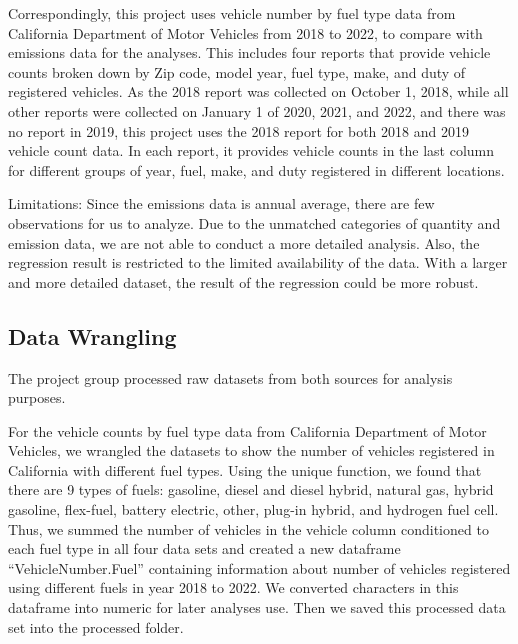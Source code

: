 \documentclass[
  12pt,
]{article}
\begin{document}
Correspondingly, this project uses vehicle number by fuel type data from
California Department of Motor Vehicles from 2018 to 2022, to compare
with emissions data for the analyses. This includes four reports that
provide vehicle counts broken down by Zip code, model year, fuel type,
make, and duty of registered vehicles. As the 2018 report was collected
on October 1, 2018, while all other reports were collected on January 1
of 2020, 2021, and 2022, and there was no report in 2019, this project
uses the 2018 report for both 2018 and 2019 vehicle count data. In each
report, it provides vehicle counts in the last column for different
groups of year, fuel, make, and duty registered in different locations.

Limitations: Since the emissions data is annual average, there are few
observations for us to analyze. Due to the unmatched categories of
quantity and emission data, we are not able to conduct a more detailed
analysis. Also, the regression result is restricted to the limited
availability of the data. With a larger and more detailed dataset, the
result of the regression could be more robust.

\hypertarget{data-wrangling}{%
\subsection{Data Wrangling}\label{data-wrangling}}

The project group processed raw datasets from both sources for analysis
purposes.

For the vehicle counts by fuel type data from California Department of
Motor Vehicles, we wrangled the datasets to show the number of vehicles
registered in California with different fuel types. Using the unique
function, we found that there are 9 types of fuels: gasoline, diesel and
diesel hybrid, natural gas, hybrid gasoline, flex-fuel, battery
electric, other, plug-in hybrid, and hydrogen fuel cell. Thus, we summed
the number of vehicles in the vehicle column conditioned to each fuel
type in all four data sets and created a new dataframe
``VehicleNumber.Fuel'' containing information about number of vehicles
registered using different fuels in year 2018 to 2022. We converted
characters in this dataframe into numeric for later analyses use. Then
we saved this processed data set into the processed folder.
\end{document}
